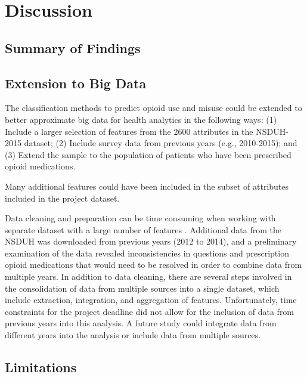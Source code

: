 \documentclass[sigconf]{acmart}
\begin{document}
\section{Discussion}

\subsection{Summary of Findings}


\subsection{Extension to Big Data}

The classification methods to predict opioid use and misuse could be extended 
to better approximate big data for health analytics in the following ways: (1) 
Include a larger selection of features from the 2600 attributes in the NSDUH-
2015 dataset; (2) Include survey data from previous years (e.g., 2010-2015); 
and (3) Extend the sample to the population of patients who have been 
prescribed opioid medications. 

Many additional features could have been included in the subset of attributes 
included in the project dataset. 

Data cleaning and preparation can be time consuming when working
with separate dataset with a large number of features \cite{rahm00}. 
Additional data from the NSDUH was downloaded from previous years (2012 to 
2014), and a preliminary examination of the data revealed inconsistencies 
in questions and prescription opioid medications that would need to be 
resolved in order to combine data from multiple years. In addition to data 
cleaning, there are several steps involved in the consolidation of data from 
multiple sources into a single dataset, which include extraction, integration, 
and aggregation of features. Unfortunately, time constraints for the project 
deadline did not allow for the inclusion of data from previous years into this 
analysis. A future study could integrate data from different years into the
analysis or include data from multiple sources. 


\subsection{Limitations}
\end{document}
